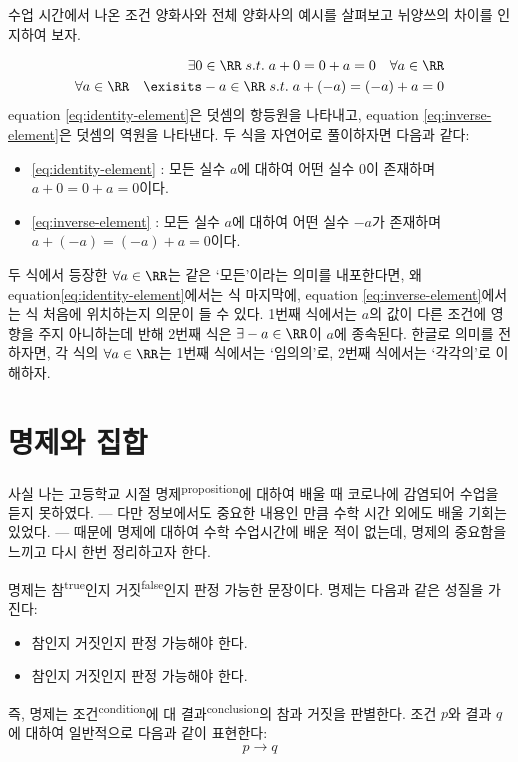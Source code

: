 \documentclass[../note.tex]{subfiles}
\begin{document}
수업 시간에서 나온 조건 양화사와 전체 양화사의 예시를 살펴보고 뉘양쓰의 차이를 인지하여 보자.
\begin{example}
  \begin{align}
    \exists 0 \in \RR\; s.t.\; a+0 = 0+a = 0\quad \forall a \in \RR \label{eq:identity-element} \\
    \forall a \in \RR \quad \exisits -a \in \RR\; s.t.\; a+(-a) = (-a)+a = 0 \label{eq:inverse-element}
  \end{align}
  equation \eqref{eq:identity-element}은 덧셈의 항등원을 나타내고, equation \eqref{eq:inverse-element}은 덧셈의 역원을 나타낸다. 두 식을 자연어로 풀이하자면 다음과 같다:
  \begin{itemize}
    \item
      \eqref{eq:identity-element} : 모든 실수 $a$에 대하여 어떤 실수 $0$이 존재하며 $a+0 = 0+a = 0$이다.
    \item
      \eqref{eq:inverse-element} : 모든 실수 $a$에 대하여 어떤 실수 $-a$가 존재하며 $a+(-a) = (-a)+a = 0$이다.
  \end{itemize}
  두 식에서 등장한 $\forall a \in \RR$는 같은 `모든'이라는 의미를 내포한다면, 왜 equation\eqref{eq:identity-element}에서는 식 마지막에, equation \eqref{eq:inverse-element}에서는 식 처음에 위치하는지 의문이 들 수 있다. 1번째 식에서는 $a$의 값이 다른 조건에 영향을 주지 아니하는데 반해 2번째 식은 $\exists -a \in \RR$이 $a$에 종속된다. 한글로 의미를 전하자면, 각 식의 $\forall a\in\RR$는 1번째 식에서는 `임의의'로, 2번째 식에서는 `각각의'로 이해하자.
\end{example}

\section{명제와 집합}
사실 나는 고등학교 시절 명제\textsuperscript{proposition}에 대하여 배울 때 코로나에 감염되어 수업을 듣지 못하였다. --- 다만 정보에서도 중요한 내용인 만큼 수학 시간 외에도 배울 기회는 있었다. --- 때문에 명제에 대하여 수학 수업시간에 배운 적이 없는데, 명제의 중요함을 느끼고 다시 한번 정리하고자 한다.

\begin{definition}[명제]
  명제는 참\textsuperscript{true}인지 거짓\textsuperscript{false}인지 판정 가능한 문장이다. 명제는 다음과 같은 성질을 가진다:
  \begin{itemize}
    \item
      참인지 거짓인지 판정 가능해야 한다.
    \item
      참인지 거짓인지 판정 가능해야 한다.
  \end{itemize}
\end{definition}
즉, 명제는 조건\textsuperscript{condition}에 대 결과\textsuperscript{conclusion}의 참과 거짓을 판별한다. 조건 $p$와 결과 $q$에 대하여 일반적으로 다음과 같이 표현한다:
\begin{equation}
  p \longrightarrow q
\end{equation}
\end{document}

